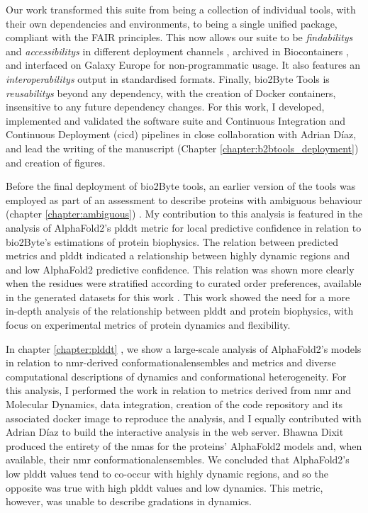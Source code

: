 Our work transformed this suite from being a collection of individual tools, with their own dependencies and environments, to being a single unified package, compliant with the FAIR principles. This now allows our suite to be \textit{\Glspl{findability}} and \textit{\Glspl{accessibility}} in different deployment channels \cite{pypi, gruning_bioconda_2018}, archived in Biocontainers \cite{da_veiga_leprevost_biocontainers_2017}, and interfaced on Galaxy Europe \cite{afgan_galaxy_2018} for non-programmatic usage. It also features an \textit{\Glspl{interoperability}} output in standardised formats. Finally, bio2Byte Tools is \textit{\Glspl{reusability}} beyond any dependency, with the creation of Docker containers, insensitive to any future dependency changes. For this work, I developed, implemented and validated the software suite and Continuous Integration and Continuous Deployment (\gls{cicd}) pipelines in close collaboration with Adrian Díaz, and lead the writing of the manuscript (Chapter \ref{chapter:b2btools_deployment}) \cite{gavalda-garcia_bio2byte_2024} and creation of figures. 

Before the final deployment of bio2Byte tools, an earlier version of the tools was employed as part of an assessment to describe proteins with ambiguous behaviour (chapter \ref{chapter:ambiguous}) \cite{roca-martinez_challenges_2022}. My contribution to this analysis is featured in the analysis of AlphaFold2's \gls{plddt} metric for local predictive confidence in relation to bio2Byte's estimations of protein biophysics. The relation between predicted metrics and \gls{plddt} indicated a relationship between highly dynamic regions and and low AlphaFold2 predictive confidence. This relation was shown more clearly when the residues were stratified according to curated order preferences, available in the generated datasets for this work \cite{roca-martinez_challenges_2022}. This work showed the need for a more in-depth analysis of the relationship between \gls{plddt} and protein biophysics, with focus on experimental metrics of protein \gls{dynamics} and \gls{flexibility}. 

In chapter \ref{chapter:plddt} \cite{gavalda-garcia_gradations_2024}, we show a large-scale analysis of AlphaFold2's models in relation to \gls{nmr}-derived \glspl{conformationalensemble} and metrics and diverse computational descriptions of \gls{dynamics} and conformational heterogeneity. For this analysis, I performed the work in relation to metrics derived from \gls{nmr} and Molecular Dynamics, data integration, creation of the code repository and its associated docker image to reproduce the analysis, and I equally contributed with Adrian Díaz to build the interactive analysis in the web server. Bhawna Dixit produced the entirety of the \glspl{nma} for the proteins' AlphaFold2 models and, when available, their \gls{nmr} \glspl{conformationalensemble}. We concluded that AlphaFold2's low \gls{plddt} values tend to co-occur with highly dynamic regions, and so the opposite was true with high \gls{plddt} values and low \gls{dynamics}. This metric, however, was unable to describe gradations in \gls{dynamics}. 

